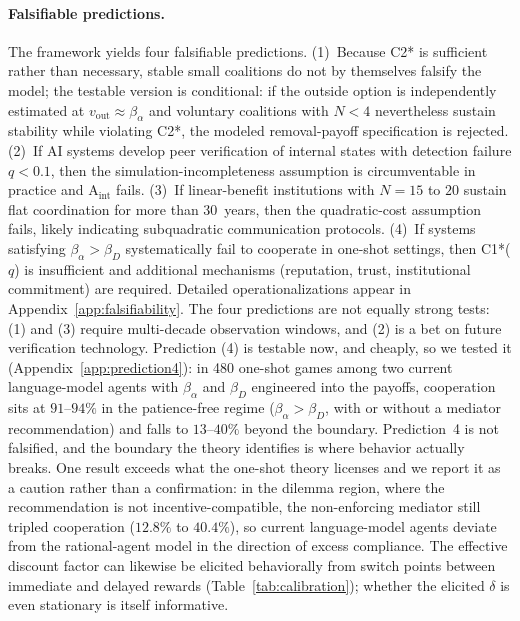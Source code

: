 \documentclass[manuscript,screen,review]{jair}
\begin{document}
\paragraph{Falsifiable predictions.}
The framework yields four falsifiable predictions. (1)~Because C2* is sufficient rather than necessary, stable small coalitions do not by themselves falsify the model; the testable version is conditional: if the outside option is independently estimated at $v_{\mathrm{out}} \approx \beta_\alpha$ and voluntary coalitions with $N{<}4$ nevertheless sustain stability while violating C2*, the modeled removal-payoff specification is rejected. (2)~If AI systems develop peer verification of internal states with detection failure $q < 0.1$, then the simulation-incompleteness assumption is circumventable in practice and A$_{\mathrm{int}}$ fails. (3)~If linear-benefit institutions with $N{=}15$ to $20$ sustain flat coordination for more than 30~years, then the quadratic-cost assumption fails, likely indicating subquadratic communication protocols. (4)~If systems satisfying $\beta_\alpha > \beta_D$ systematically fail to cooperate in one-shot settings, then C1*($q$) is insufficient and additional mechanisms (reputation, trust, institutional commitment) are required. Detailed operationalizations appear in Appendix~\ref{app:falsifiability}. The four predictions are not equally strong tests: (1) and (3) require multi-decade observation windows, and (2) is a bet on future verification technology. Prediction (4) is testable now, and cheaply, so we tested it (Appendix~\ref{app:prediction4}): in 480 one-shot games among two current language-model agents with $\beta_\alpha$ and $\beta_D$ engineered into the payoffs, cooperation sits at $91$--$94\%$ in the patience-free regime ($\beta_\alpha > \beta_D$, with or without a mediator recommendation) and falls to $13$--$40\%$ beyond the boundary. Prediction~4 is not falsified, and the boundary the theory identifies is where behavior actually breaks. One result exceeds what the one-shot theory licenses and we report it as a caution rather than a confirmation: in the dilemma region, where the recommendation is not incentive-compatible, the non-enforcing mediator still tripled cooperation ($12.8\%$ to $40.4\%$), so current language-model agents deviate from the rational-agent model in the direction of excess compliance. The effective discount factor can likewise be elicited behaviorally from switch points between immediate and delayed rewards (Table~\ref{tab:calibration}); whether the elicited $\delta$ is even stationary is itself informative.
\end{document}
